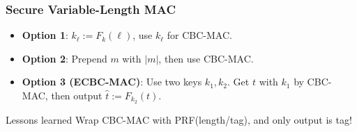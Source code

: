 \begin{frame}\frametitle{Secure Variable-Length MAC}
\begin{itemize}
\item \textbf{Option 1}: $k_{\ell} := F_k(\ell)$, use $k_{\ell}$ for CBC-MAC.
\item \textbf{Option 2}: Prepend $m$ with $|m|$, then use CBC-MAC.
\begin{figure}
\begin{center}

\end{center}
\end{figure}
\item \textbf{Option 3 (ECBC-MAC)}: Use two keys $k_1, k_2$. Get $t$ with $k_1$ by CBC-MAC, then output $\hat{t} := F_{k_2}(t)$.
\end{itemize}
\begin{alertblock}{Lessons learned}
Wrap CBC-MAC with PRF(length/tag), and only output is tag!
\end{alertblock}
\end{frame}

